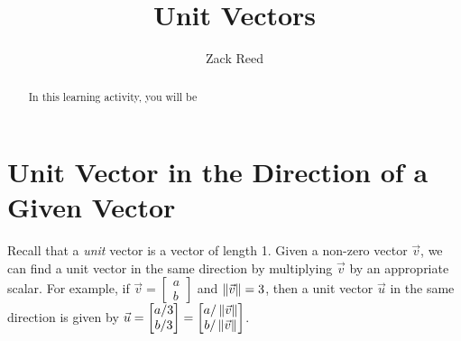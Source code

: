 \documentclass{ximera}
\author{Zack Reed}
\title{Unit Vectors}
\begin{document}
\begin{abstract}

    In this learning activity, you will be 
\end{abstract}
\maketitle

\section*{Unit Vector in the Direction of a Given Vector}
Recall that a {\it unit} vector is a vector of length 1.  Given a non-zero vector $\vec{v}$, we can find a unit vector in the same direction by multiplying $\vec{v}$ by an appropriate scalar.  For example, if $\vec{v}=\begin{bmatrix}a\\b\end{bmatrix}$ and $\left\|\vec{v}\right\|=3$, then a unit vector $\vec{u}$ in the same direction is given by $\vec{u}=\begin{bmatrix}a/3\\b/3\end{bmatrix}=\begin{bmatrix}a/\left\|\vec{v}\right\|\\b/\left\|\vec{v}\right\|\end{bmatrix}$.


 
\begin{center}
\end{center}
\end{document}
